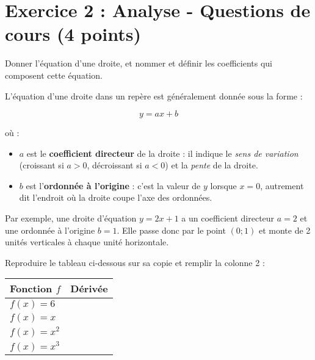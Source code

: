 \documentclass[answers]{exam}
\begin{document}
\section*{Exercice 2 : Analyse - Questions de cours (4 points)}

\begin{questions}

\question[2] Donner l'équation d'une droite, et nommer et définir les coefficients qui composent cette équation.
\begin{solution}
  L'équation d'une droite dans un repère est généralement donnée sous la forme :
  
  \[
  y = ax + b
  \]
  
  où :
  \begin{itemize}
    \item \( a \) est le \textbf{coefficient directeur} de la droite : il indique le \textit{sens de variation} (croissant si \( a > 0 \), décroissant si \( a < 0 \)) et la \textit{pente} de la droite.
    \item \( b \) est l'\textbf{ordonnée à l’origine} : c’est la valeur de \( y \) lorsque \( x = 0 \), autrement dit l’endroit où la droite coupe l’axe des ordonnées.
  \end{itemize}
  
  Par exemple, une droite d’équation \( y = 2x + 1 \) a un coefficient directeur \( a = 2 \) et une ordonnée à l’origine \( b = 1 \). Elle passe donc par le point \( (0 ; 1) \) et monte de 2 unités verticales à chaque unité horizontale.
  \end{solution}
\question[2] Reproduire le tableau ci-dessous sur sa copie et remplir la colonne 2 :

\vspace{0.5cm}

\begin{center}
\renewcommand{\arraystretch}{2} %
\begin{tabular}{|p{8cm}|p{6cm}|}
\hline
\textbf{Fonction $f$} & \textbf{Dérivée} \\
\hline
$f(x) = 6$ &  \\
\hline
$f(x) = x$ &  \\
\hline
$f(x) = x^2$ &  \\
\hline
$f(x) = x^3$ &  \\
\hline
\end{tabular}
\end{center}

\vspace{0.5cm}

\end{questions}
\end{document}
